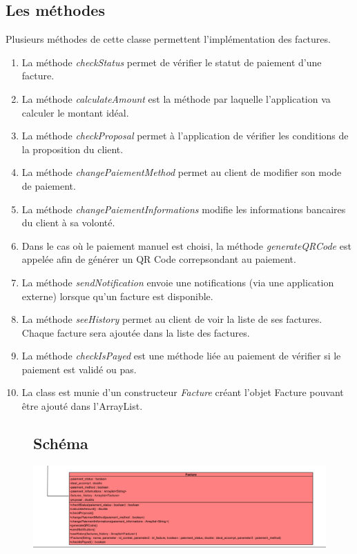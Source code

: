\newpage
\subsection{Les méthodes}
\begin{flushleft}
Plusieurs méthodes de cette classe permettent l'implémentation des factures.
\end{flushleft}

\begin{enumerate}[-]

\item La méthode \emph{checkStatus} permet de vérifier le statut de paiement d'une facture.

\item La méthode \emph{calculateAmount} est la méthode par laquelle l'application va calculer le montant idéal.

\item La méthode \emph{checkProposal} permet à l'application de vérifier les conditions de la proposition du client.

\item La méthode \emph{changePaiementMethod} permet au client de modifier son mode de paiement.

\item La méthode \emph{changePaiementInformations} modifie les informations bancaires du client à sa volonté.

\item Dans le cas où le paiement manuel est choisi, la méthode \emph{generateQRCode} est appelée afin de générer un QR Code correpsondant au paiement.

\item La méthode \emph{sendNotification} envoie une notifications (via une application externe) lorsque qu'un facture est disponible.

\item La méthode \emph{seeHistory} permet au client de voir la liste de ses factures. Chaque facture sera ajoutée dans la liste des factures.

\item La méthode \emph{checkIsPayed} est une méthode liée au paiement de vérifier si le paiement est validé ou pas.

\item La class est munie d'un constructeur \emph{Facture} créant l'objet Facture pouvant être ajouté dans l'ArrayList.

\end{enumerate}

\newpage
\begin{figure}[h]
\subsection{Schéma}
\centering
\includegraphics[width = 1.3\textwidth]{extension-maxime/class/img/class-extension.png}
\end{figure}


